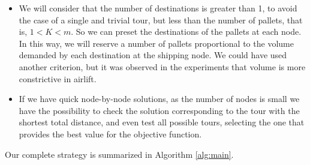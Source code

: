 \documentclass[preprint]{elsarticle}
\begin{document}
\begin{itemize}
	
\item We will consider that the number of destinations is greater than 1, to avoid the case of a single and trivial tour, but less than the number of pallets, that is, $1 < K < m$. So we can preset the destinations of the pallets at each node. In this way, we will reserve a number of pallets proportional to the volume demanded by each destination at the shipping node. We could have used another criterion, but it was observed in the experiments that volume is more constrictive in airlift.
	
\item If we have quick node-by-node solutions, as the number of nodes is small we have the possibility to check the solution corresponding to the tour with the shortest total distance, and even test all possible tours, selecting the one that provides the best value for the objective function.


\end{itemize}

Our complete strategy is summarized in Algorithm \ref{alg:main}.
\end{document}
